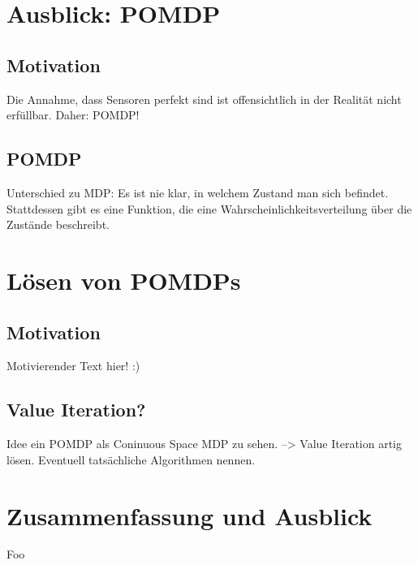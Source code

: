 \documentclass[a4paper]{IEEEtran}
\begin{document}
\section{Ausblick: POMDP}
\subsection{Motivation}
Die Annahme, dass Sensoren perfekt sind ist offensichtlich in der Realität nicht erfüllbar. Daher: POMDP!

\subsection{POMDP}
Unterschied zu MDP: Es ist nie klar, in welchem Zustand man sich befindet. Stattdessen gibt es eine Funktion, die eine Wahrscheinlichkeitsverteilung über die Zustände beschreibt.


\section{Lösen von POMDPs}
\subsection{Motivation}
Motivierender Text hier! :)

\subsection{Value Iteration?}
Idee ein POMDP als Coninuous Space MDP zu sehen. --> Value Iteration artig lösen. Eventuell tatsächliche Algorithmen nennen.

\section{Zusammenfassung und Ausblick}
Foo



\end{document}

